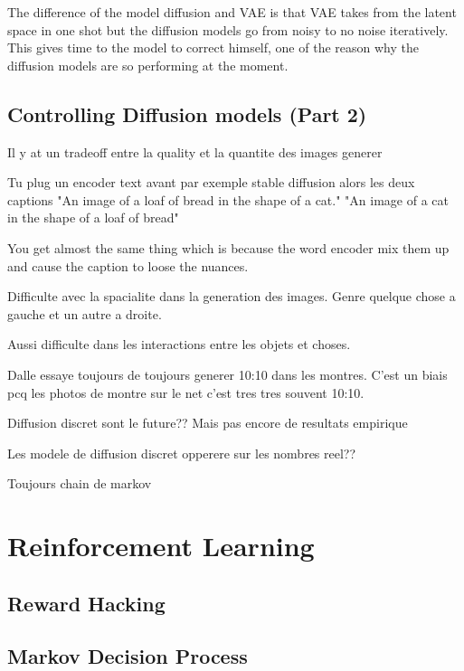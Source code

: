 \documentclass{article}
\begin{document}
The difference of the model diffusion and VAE is that VAE takes from the latent space in one shot but the diffusion models go from noisy to no noise iteratively. This gives time to the model to correct himself, one of the reason why the diffusion models are so performing at the moment.

\subsection{Controlling Diffusion models (Part 2)}

Il y at un tradeoff entre la quality et la quantite des images generer

Tu plug un encoder text avant par exemple stable diffusion alors les deux captions
"An image of a loaf of bread in the shape of a cat."
"An image of a cat in the shape of a loaf of bread"

You get almost the same thing which is because the word encoder mix them up and cause the caption to loose the nuances.

Difficulte avec la spacialite dans la generation des images. Genre quelque chose a gauche et un autre a droite.

Aussi difficulte dans les interactions entre les objets et choses.

Dalle essaye toujours de toujours generer 10:10 dans les montres. C'est un biais pcq les photos de montre sur le net c'est tres tres souvent 10:10.

Diffusion discret sont le future?? Mais pas encore de resultats empirique

Les modele de diffusion discret opperere sur les nombres reel??

Toujours chain de markov

\clearpage\newpage

\section{Reinforcement Learning}

\subsection{Reward Hacking}

\subsection{Markov Decision Process}
\end{document}
